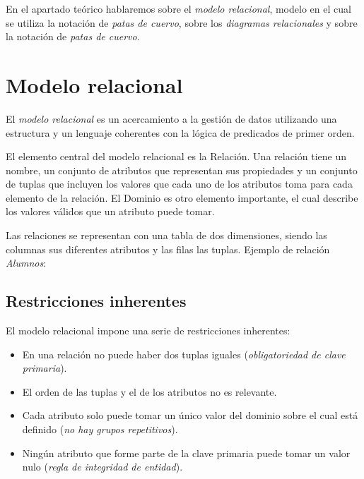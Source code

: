En el apartado teórico hablaremos sobre el \emph{modelo relacional}, modelo en el cual se utiliza la notación de \emph{patas de cuervo}, sobre los \emph{diagramas relacionales} y sobre la notación de \emph{patas de cuervo}.

\section{Modelo relacional}
El \emph{modelo relacional} es un acercamiento a la gestión de datos utilizando una estructura y un lenguaje coherentes con la lógica de predicados de primer orden.

El elemento central del modelo relacional es la Relación. Una relación tiene un nombre, un conjunto de atributos que representan sus propiedades y un conjunto de tuplas que incluyen los valores que cada uno de los atributos toma para cada elemento de la relación. El Dominio es otro elemento importante, el cual describe los valores válidos que un atributo puede tomar\cite{des-bd}.

Las relaciones se representan con una tabla de dos dimensiones, siendo las columnas sus diferentes atributos y las filas las tuplas. Ejemplo de relación \textit{Alumnos}:

\subsection{Restricciones inherentes}
El modelo relacional impone una serie de restricciones inherentes:
\begin{itemize}
    \item En una relación no puede haber dos tuplas iguales (\textit{obligatoriedad de clave primaria}).
    \item El orden de las tuplas y el de los atributos no es relevante.
    \item Cada atributo solo puede tomar un único valor del dominio sobre el cual está definido (\textit{no hay grupos repetitivos}).
    \item Ningún atributo que forme parte de la clave primaria puede tomar un valor nulo (\textit{regla de integridad de entidad}).
\end{itemize}

